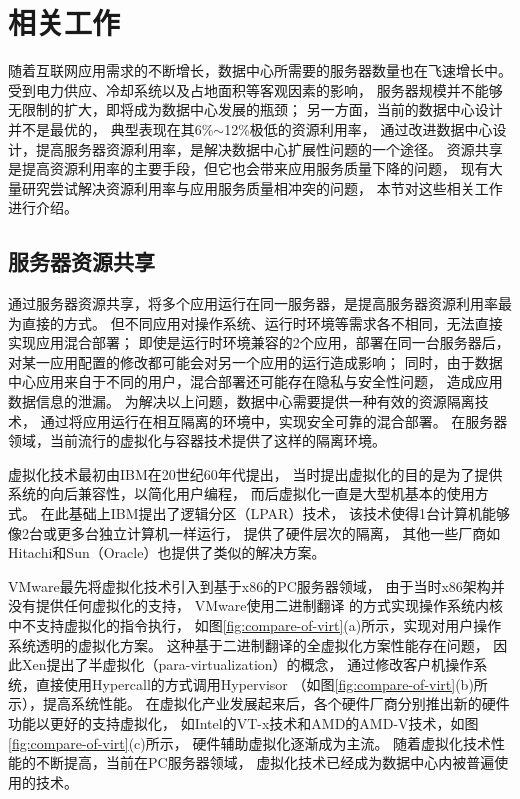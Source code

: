 

\chapter{相关工作}
\label{chap:background}

随着互联网应用需求的不断增长，数据中心所需要的服务器数量也在飞速增长中。
受到电力供应、冷却系统以及占地面积等客观因素的影响，
服务器规模并不能够无限制的扩大，即将成为数据中心发展的瓶颈；
另一方面，当前的数据中心设计并不是最优的，
典型表现在其6\%$\sim$12\%极低的资源利用率，
通过改进数据中心设计，提高服务器资源利用率，是解决数据中心扩展性问题的一个途径。
资源共享是提高资源利用率的主要手段，但它也会带来应用服务质量下降的问题，
现有大量研究尝试解决资源利用率与应用服务质量相冲突的问题，
本节对这些相关工作进行介绍。

\section{服务器资源共享}

通过服务器资源共享，将多个应用运行在同一服务器，是提高服务器资源利用率最为直接的方式。
但不同应用对操作系统、运行时环境等需求各不相同，无法直接实现应用混合部署；
即使是运行时环境兼容的2个应用，部署在同一台服务器后，
对某一应用配置的修改都可能会对另一个应用的运行造成影响；
同时，由于数据中心应用来自于不同的用户，混合部署还可能存在隐私与安全性问题，
造成应用数据信息的泄漏。
为解决以上问题，数据中心需要提供一种有效的资源隔离技术，
通过将应用运行在相互隔离的环境中，实现安全可靠的混合部署。
在服务器领域，当前流行的虚拟化与容器技术提供了这样的隔离环境。

虚拟化技术最初由IBM在20世纪60年代提出，
当时提出虚拟化的目的是为了提供系统的向后兼容性，以简化用户编程，
而后虚拟化一直是大型机基本的使用方式。
在此基础上IBM提出了逻辑分区（LPAR）\cite{IBM_LPAR:2007}技术，
该技术使得1台计算机能够像2台或更多台独立计算机一样运行，
提供了硬件层次的隔离，
其他一些厂商如Hitachi\cite{hitachi-lpar}和Sun（Oracle）\cite{LDom}也提供了类似的解决方案。

VMware最先将虚拟化技术引入到基于x86的PC服务器领域，
由于当时x86架构并没有提供任何虚拟化的支持，
VMware使用二进制翻译\cite{vmware-compare-hw-sw:2006}
的方式实现操作系统内核中不支持虚拟化的指令执行，
如图\ref{fig:compare-of-virt}(a)所示，实现对用户操作系统透明的虚拟化方案。
这种基于二进制翻译的全虚拟化方案性能存在问题，
因此Xen提出了半虚拟化（para-virtualization）\cite{barham_xen_2003}的概念，
通过修改客户机操作系统，直接使用Hypercall的方式调用Hypervisor
（如图\ref{fig:compare-of-virt}(b)所示），提高系统性能。
在虚拟化产业发展起来后，各个硬件厂商分别推出新的硬件功能以更好的支持虚拟化，
如Intel的VT-x技术和AMD的AMD-V技术，如图\ref{fig:compare-of-virt}(c)所示，
硬件辅助虚拟化逐渐成为主流。
随着虚拟化技术性能的不断提高，当前在PC服务器领域，
虚拟化技术已经成为数据中心内被普遍使用的技术。


